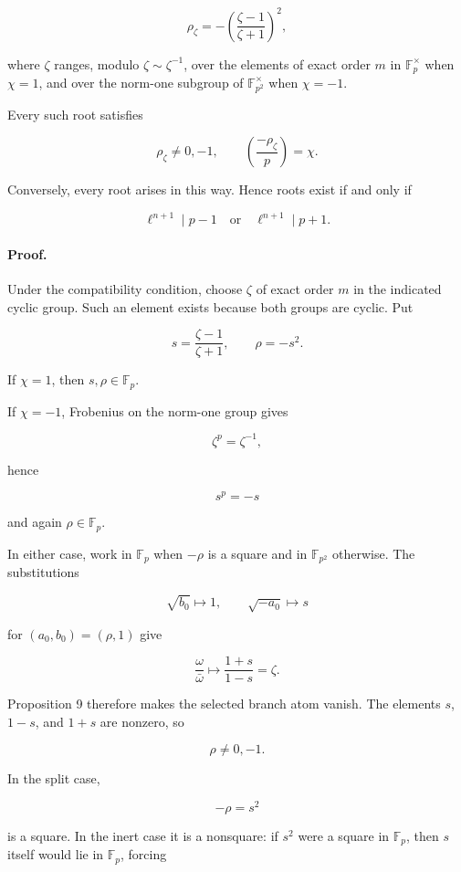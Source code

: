 \documentclass[11pt]{article}
\begin{document}
\[
\rho_\zeta
=
-\left(
\frac{\zeta-1}{\zeta+1}
\right)^2,
\]

where \(\zeta\) ranges, modulo \(\zeta\sim\zeta^{-1}\), over the
elements of exact order \(m\) in \(\mathbb F_p^\times\) when \(\chi=1\),
and over the norm-one subgroup of \(\mathbb F_{p^2}^\times\) when
\(\chi=-1\).

Every such root satisfies

\[
\rho_\zeta\ne0,-1,
\qquad
\left(\frac{-\rho_\zeta}{p}\right)
=
\chi.
\]

Conversely, every root arises in this way. Hence roots exist if and only if

\[
\ell^{n+1}\mid p-1
\quad\text{or}\quad
\ell^{n+1}\mid p+1.
\]

\paragraph{Proof.}

Under the compatibility condition, choose \(\zeta\) of exact order \(m\)
in the indicated cyclic group. Such an element exists because both groups
are cyclic. Put

\[
s
=
\frac{\zeta-1}{\zeta+1},
\qquad
\rho=-s^2.
\]

If \(\chi=1\), then \(s,\rho\in\mathbb F_p\).

If \(\chi=-1\), Frobenius on the norm-one group gives

\[
\zeta^p=\zeta^{-1},
\]

hence

\[
s^p=-s
\]

and again \(\rho\in\mathbb F_p\).

In either case, work in \(\mathbb F_p\) when \(-\rho\) is a square and in
\(\mathbb F_{p^2}\) otherwise. The substitutions

\[
\sqrt{b_0}\longmapsto1,
\qquad
\sqrt{-a_0}\longmapsto s
\]

for \((a_0,b_0)=(\rho,1)\) give

\[
\frac{\omega}{\bar\omega}
\longmapsto
\frac{1+s}{1-s}
=
\zeta.
\]

Proposition 9 therefore makes the selected branch atom vanish. The
elements \(s\), \(1-s\), and \(1+s\) are nonzero, so

\[
\rho\ne0,-1.
\]

In the split case,

\[
-\rho=s^2
\]

is a square. In the inert case it is a nonsquare: if \(s^2\) were a square
in \(\mathbb F_p\), then \(s\) itself would lie in \(\mathbb F_p\),
forcing
\end{document}
